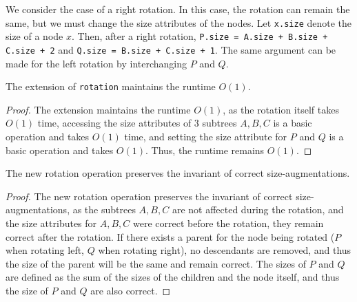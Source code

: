 \documentclass[11pt]{scrartcl}
\theoremstyle{dotlessP}
\theoremstyle{dotlessN}
\begin{document}
\begin{enumerate}[(a)]
		We consider the case of a right rotation. In this case, the rotation can remain the same, but we must change the size attributes of the nodes. Let \texttt{x.size} denote the size of a node $x$. Then, after a right rotation, \texttt{P.size = A.size + B.size + C.size + 2} and \texttt{Q.size = B.size + C.size + 1}. The same argument can be made for the left rotation by interchanging $P$ and $Q$.
		\\
		\begin{claim*}
			The extension of \texttt{rotation} maintains the runtime $O(1)$.
		\end{claim*}
		\begin{proof}
		The extension maintains the runtime $O(1)$, as the rotation itself takes $O(1)$ time, accessing the size attributes of 3 subtrees $A, B, C$  is a basic operation and takes $O(1)$ time, and setting the size attribute for $P$ and $Q$ is a basic operation and takes $O(1)$. Thus, the runtime remains $O(1)$. 
		\end{proof}
		\begin{claim*}
			The new rotation operation preserves the invariant of correct size-augmentations.
		\end{claim*}
		\begin{proof}
		The new rotation operation preserves the invariant of correct size-augmentations, as the subtrees $A, B, C$ are not affected during the rotation, and the size attributes for $A,B,C$ were correct before the rotation, they remain correct after the rotation. If there exists a parent for the node being rotated ($P$ when rotating left, $Q$ when rotating right), no descendants are removed, and thus the size of the parent will be the same and remain correct. The sizes of $P$ and  $Q$ are defined as the sum of the sizes of the children and the node itself, and thus the size of $P$ and $Q$ are also correct.
		\end{proof}
\end{enumerate}
\end{document}
